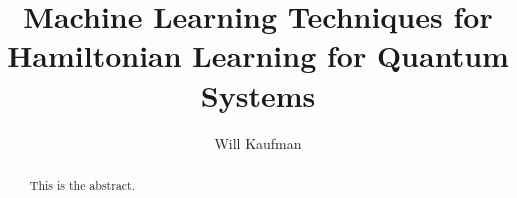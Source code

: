 \documentclass{article}
\title{Machine Learning Techniques for Hamiltonian Learning for Quantum Systems}
\author{Will Kaufman}
\begin{document}
\maketitle

\begin{abstract}

This is the abstract.



\end{abstract}
\end{document}
